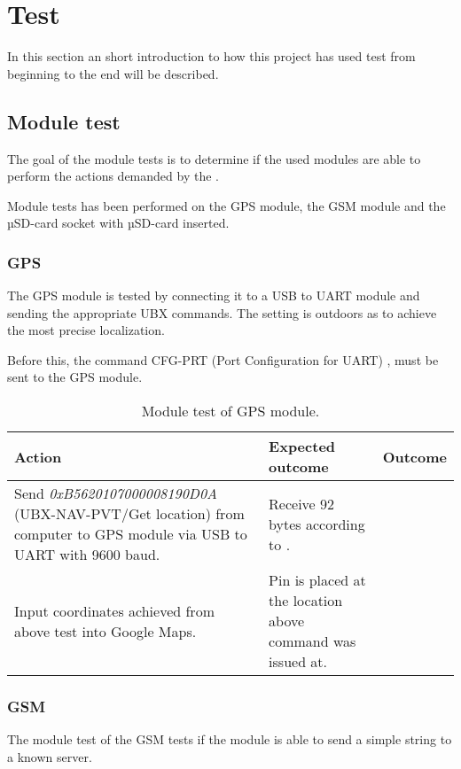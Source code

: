 
\chapter{Test}
In this section an short introduction to how this project has used test from beginning to the end will be described.

\section{Module test}
The goal of the module tests is to determine if the used modules are able to perform the actions demanded by the .

Module tests has been performed on the \GPS GPS module, the \SARA GSM module and the \SDsock µSD-card socket with µSD-card inserted.

\subsection{GPS \GPS}
The GPS module is tested by connecting it to a USB to UART module and sending the appropriate UBX commands. The setting is outdoors as to achieve the most precise localization.

Before this, the command CFG-PRT (Port Configuration for UART) \cite[p.~119-120]{NEO7_proto}, must be sent to the GPS module.

\begin{table}[H]
	\centering
	\begin{tabularx}{\textwidth}{p{4.3cm} X X}
		\toprule
		\textbf{Action} & \textbf{Expected outcome} & \textbf{Outcome} \\
		\midrule
		Send \textit{0xB5620107000008190D0A} (UBX-NAV-PVT/Get location) from computer to GPS module via USB to UART with \num{9600} baud. & Receive \num{92} bytes according to \cite[p.~160-161]{NEO7_proto}. & \\
		\midrule
		Input coordinates achieved from above test into Google Maps. & Pin is placed at the location above command was issued at. & \\
		\bottomrule
	\end{tabularx}
	\caption{Module test of \GPS GPS module.}
	\label{AT:modGPS}
\end{table}

\subsection{GSM \SARA}
The module test of the GSM \SARA tests if the module is able to send a simple string to a known server.

